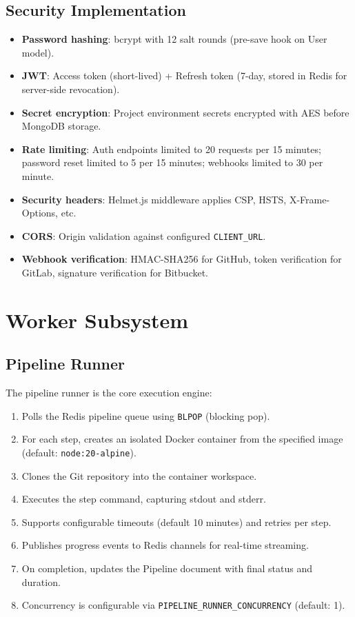 \documentclass[12pt,a4paper,twoside]{report}
\begin{document}
\subsection{Security Implementation}

\begin{itemize}[noitemsep]
  \item \textbf{Password hashing}: bcrypt with 12 salt rounds (pre-save hook on User model).
  \item \textbf{JWT}: Access token (short-lived) + Refresh token (7-day, stored in Redis for server-side revocation).
  \item \textbf{Secret encryption}: Project environment secrets encrypted with AES before MongoDB storage.
  \item \textbf{Rate limiting}: Auth endpoints limited to 20 requests per 15 minutes; password reset limited to 5 per 15 minutes; webhooks limited to 30 per minute.
  \item \textbf{Security headers}: Helmet.js middleware applies CSP, HSTS, X-Frame-Options, etc.
  \item \textbf{CORS}: Origin validation against configured \texttt{CLIENT\_URL}.
  \item \textbf{Webhook verification}: HMAC-SHA256 for GitHub, token verification for GitLab, signature verification for Bitbucket.
\end{itemize}

\section{Worker Subsystem}

\subsection{Pipeline Runner}

The pipeline runner is the core execution engine:

\begin{enumerate}[noitemsep]
  \item Polls the Redis pipeline queue using \texttt{BLPOP} (blocking pop).
  \item For each step, creates an isolated Docker container from the specified image (default: \texttt{node:20-alpine}).
  \item Clones the Git repository into the container workspace.
  \item Executes the step command, capturing stdout and stderr.
  \item Supports configurable timeouts (default 10 minutes) and retries per step.
  \item Publishes progress events to Redis channels for real-time streaming.
  \item On completion, updates the Pipeline document with final status and duration.
  \item Concurrency is configurable via \texttt{PIPELINE\_RUNNER\_CONCURRENCY} (default: 1).
\end{enumerate}
\end{document}

